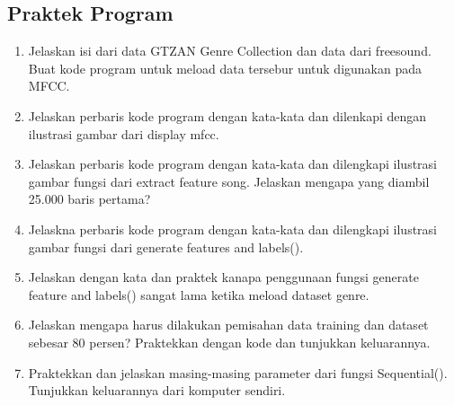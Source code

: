 \subsection{Praktek Program}
\begin{enumerate}

\item Jelaskan isi dari data GTZAN Genre Collection dan data dari freesound. Buat kode program untuk meload data tersebur untuk digunakan pada MFCC.

	\hfill\break
	

\item Jelaskan perbaris kode program dengan kata-kata dan dilenkapi dengan ilustrasi gambar dari display mfcc.
	\hfill\break
	
	
\item Jelaskan perbaris kode program dengan kata-kata dan dilengkapi ilustrasi gambar fungsi dari extract feature song. Jelaskan mengapa yang diambil 25.000 baris pertama?

	\hfill\break
	

\item Jelaskna perbaris kode program dengan kata-kata dan dilengkapi ilustrasi gambar fungsi dari generate features and labels().

	\hfill\break
	

\item Jelaskan dengan kata dan praktek kanapa penggunaan fungsi generate feature and labels() sangat lama ketika meload dataset genre.

	\hfill\break
	

\item Jelaskan mengapa harus dilakukan pemisahan data training dan dataset sebesar 80 persen? Praktekkan dengan kode dan tunjukkan keluarannya.

	\hfill\break
	

\item Praktekkan dan jelaskan masing-masing parameter dari fungsi Sequential(). Tunjukkan keluarannya dari komputer sendiri.

	\hfill\break
	


\end{enumerate}
